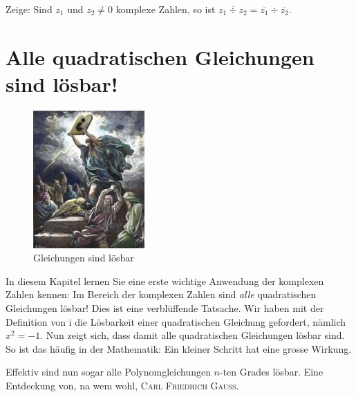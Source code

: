 \documentclass[%
11pt,%
twoside,%
titlepage,%
german,%
headsepline%
]{scrartcl}
\begin{document}
\begin{ueb}
Zeige: Sind $z_1$ und $z_2\neq0$ komplexe Zahlen, so ist $\overline{z_1\div z_2}=\overline{z_1}\div\overline{z_2}$.
\end{ueb}

\clearpage

\section{Alle quadratischen Gleichungen sind l\"osbar!}

\begin{figure}
\vspace{-22pt}
  \begin{center}
    \includegraphics[width=0.38\textwidth]{pictures/imagin}
  \end{center}
\caption{Gleichungen sind l\"osbar}
\vspace{-22pt}
\end{figure}
In diesem Kapitel lernen Sie eine erste wichtige Anwendung der komplexen Zahlen kennen: Im Bereich der komplexen Zahlen sind \emph{alle} quadratischen Gleichungen l\"osbar!
Dies ist eine verbl\"uffende Tatsache. Wir haben mit der Definition von $\mathrm{i}$ die L\"osbarkeit einer quadratischen Gleichung gefordert, nämlich $x^2 = -1$. Nun zeigt sich, dass damit alle quadratischen Gleichungen l\"osbar sind. So ist das häufig in der Mathematik: Ein kleiner Schritt hat eine grosse Wirkung.
\begin{bem}
Effektiv sind nun sogar alle Polynomgleichungen $n$-ten Grades l\"osbar. Eine Entdeckung von, na wem wohl, \textsc{Carl Friedrich Gauss}.
\end{bem}
\end{document}

